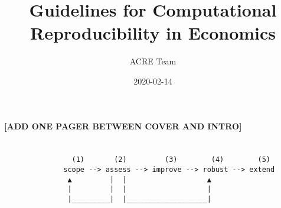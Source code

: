 \documentclass[]{book}
\title{Guidelines for Computational Reproducibility in Economics}
\author{ACRE Team}
\date{2020-02-14}
\begin{document}
\maketitle

{
\setcounter{tocdepth}{1}
\tableofcontents
}
\textbf{{[}ADD ONE PAGER BETWEEN COVER AND INTRO{]}}

\hypertarget{section}{%
\chapter*{}\label{section}}

\begin{verbatim}
                (1)       (2)         (3)        (4)        (5)
              scope --> assess --> improve --> robust --> extend
               ▲         |  |                   ▲
               |         |  |                   |
               |_________|  |___________________|
\end{verbatim}
\end{document}

